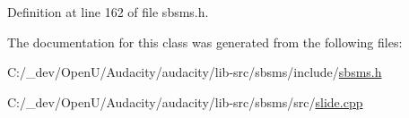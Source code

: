Definition at line 162 of file sbsms.\+h.



The documentation for this class was generated from the following files\+:\begin{DoxyCompactItemize}
\item 
C\+:/\+\_\+dev/\+Open\+U/\+Audacity/audacity/lib-\/src/sbsms/include/\hyperlink{sbsms_8h}{sbsms.\+h}\item 
C\+:/\+\_\+dev/\+Open\+U/\+Audacity/audacity/lib-\/src/sbsms/src/\hyperlink{slide_8cpp}{slide.\+cpp}\end{DoxyCompactItemize}
